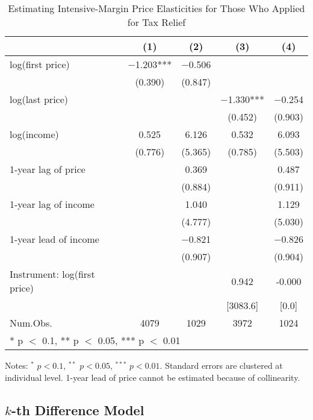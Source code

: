 \documentclass[
  11pt,
  a4paper,
]{article}
\begin{document}
\begin{table}

\caption{\label{tab:R1Elasticity}Estimating Intensive-Margin Price Elasticities for Those Who Applied for Tax Relief}
\centering
\fontsize{5}{7}\selectfont
\begin{threeparttable}
\begin{tabular}[t]{lcccc}
\toprule
  & (1) & (2) & (3) & (4)\\
\midrule
log(first price) & \num{-1.203}*** & \num{-0.506} &  & \\
 & (\num{0.390}) & (\num{0.847}) &  & \\
log(last price) &  &  & \num{-1.330}*** & \num{-0.254}\\
 &  &  & (\num{0.452}) & (\num{0.903})\\
log(income) & \num{0.525} & \num{6.126} & \num{0.532} & \num{6.093}\\
 & (\num{0.776}) & (\num{5.365}) & (\num{0.785}) & (\num{5.503})\\
1-year lag of price &  & \num{0.369} &  & \num{0.487}\\
 &  & (\num{0.884}) &  & (\num{0.911})\\
1-year lag of income &  & \num{1.040} &  & \num{1.129}\\
 &  & (\num{4.777}) &  & (\num{5.030})\\
1-year lead of income &  & \num{-0.821} &  & \num{-0.826}\\
 &  & (\num{0.907}) &  & (\num{0.904})\\
\midrule
Instrument: log(first price) &  &  & 0.942 & -0.000\\
 &  &  & {}[3083.6] & {}[0.0]\\
Num.Obs. & \num{4079} & \num{1029} & \num{3972} & \num{1024}\\
\bottomrule
\multicolumn{5}{l}{\rule{0pt}{1em}* p $<$ 0.1, ** p $<$ 0.05, *** p $<$ 0.01}\\
\end{tabular}
\begin{tablenotes}
\item Notes: $^{*}$ $p < 0.1$, $^{**}$ $p < 0.05$, $^{***}$ $p < 0.01$. Standard errors are clustered at individual level. 1-year lead of price cannot be estimated because of collinearity.
\end{tablenotes}
\end{threeparttable}
\end{table}

\hypertarget{k-th-difference-model}{%
\subsection{\texorpdfstring{\(k\)-th Difference Model}{k-th Difference Model}}\label{k-th-difference-model}}
\end{document}
